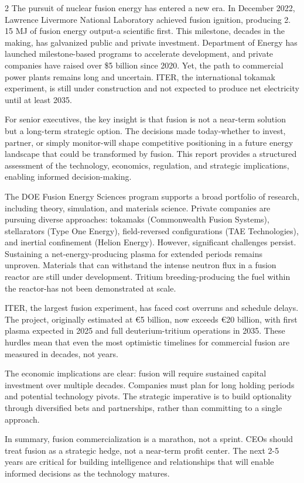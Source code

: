\documentclass[10pt,a4paper]{article}
\begin{document}
\begin{multicols}{2}
{\small The pursuit of nuclear fusion energy has entered a new era. In December 2022, Lawrence Livermore National Laboratory achieved fusion ignition, producing 2. 15 MJ of fusion energy output-a scientific first. This milestone, decades in the making, has galvanized public and private investment. Department of Energy has launched milestone-based programs to accelerate development, and private companies have raised over \$5 billion since 2020. Yet, the path to commercial power plants remains long and uncertain. ITER, the international tokamak experiment, is still under construction and not expected to produce net electricity until at least 2035.}\par
{\small For senior executives, the key insight is that fusion is not a near-term solution but a long-term strategic option. The decisions made today-whether to invest, partner, or simply monitor-will shape competitive positioning in a future energy landscape that could be transformed by fusion. This report provides a structured assessment of the technology, economics, regulation, and strategic implications, enabling informed decision-making.}\par
{\small The DOE Fusion Energy Sciences program supports a broad portfolio of research, including theory, simulation, and materials science. Private companies are pursuing diverse approaches: tokamaks (Commonwealth Fusion Systems), stellarators (Type One Energy), field-reversed configurations (TAE Technologies), and inertial confinement (Helion Energy). However, significant challenges persist. Sustaining a net-energy-producing plasma for extended periods remains unproven. Materials that can withstand the intense neutron flux in a fusion reactor are still under development. Tritium breeding-producing the fuel within the reactor-has not been demonstrated at scale.}\par
{\small ITER, the largest fusion experiment, has faced cost overruns and schedule delays. The project, originally estimated at €5 billion, now exceeds €20 billion, with first plasma expected in 2025 and full deuterium-tritium operations in 2035. These hurdles mean that even the most optimistic timelines for commercial fusion are measured in decades, not years.}\par
{\small The economic implications are clear: fusion will require sustained capital investment over multiple decades. Companies must plan for long holding periods and potential technology pivots. The strategic imperative is to build optionality through diversified bets and partnerships, rather than committing to a single approach.}\par
{\small In summary, fusion commercialization is a marathon, not a sprint. CEOs should treat fusion as a strategic hedge, not a near-term profit center. The next 2-5 years are critical for building intelligence and relationships that will enable informed decisions as the technology matures.}\par
\end{multicols}
\label{chap:1:end}
\end{document}
